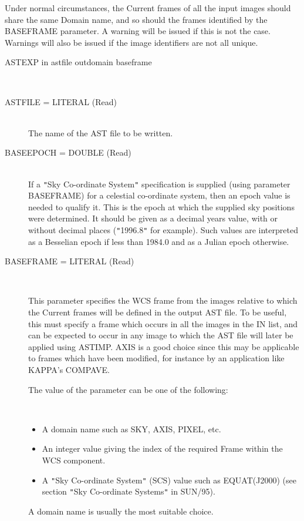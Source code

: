 \documentclass[twoside,11pt]{article}
\newcommand{\htmlref}[2]{#1}
\newcommand{\xref}[3]{#1}
\renewcommand{\_}{\texttt{\symbol{95}}}
\newcommand{\qt}[1]{{\tt "}#1{\tt "}}
\newcommand{\xroutine}[1]{\htmlref{{\sc #1}}{#1}}
\newcommand{\sstusage}[1]{\item[Usage:] \mbox{}
   \begin{description}
      {\ssttt \item #1}
   \end{description}
}
\newcommand{\sstparameters}[1]{
   \item[Parameters:] \mbox{} \\
   \vspace{-3.5ex}
   \begin{description}
      #1
   \end{description}
}
\newcommand{\sstsubsection}[1]{ \item[{#1}] \mbox{} \\}
\newcommand{\sstitemlist}[1]{
  \mbox{} \\
  \vspace{-3.5ex}
  \begin{itemize}
     #1
  \end{itemize}
}
\newcommand{\sstitem}{\item}
\newcommand{\sstusage}[1]{\item[Usage:]
      \begin{description}
         {\ssttt #1}
      \end{description}
      \\
   }
\newcommand{\sstparameters}[1]{
      \item[Parameters:] \\
      \begin{description}
         #1
      \end{description}
      \\
   }
\newcommand{\sstsubsection}[1]{\item[{#1}]}
\newcommand{\sstitemlist}[1]{
      \begin{itemize}
         #1
      \end{itemize}
      \\
   }
\newcommand{\sstitem}{\item}
\begin{document}
{{      Under normal circumstances, the Current frames of all the input
      images should share the same Domain name, and so should the frames
      identified by the BASEFRAME parameter.   A warning will be issued
      if this is not the case.  Warnings will also be issued if the image
      identifiers are not all unique.
   }
   \sstusage{
      ASTEXP in astfile outdomain baseframe
   }
   \sstparameters{
      \sstsubsection{
         ASTFILE = LITERAL (Read)
      } {
         The name of the AST file to be written.
      }
      \sstsubsection {
         BASEEPOCH = \_DOUBLE (Read)
      } {
         If a \qt{Sky Co-ordinate System} specification is supplied 
         (using
         parameter BASEFRAME) for a celestial co-ordinate system, then
         an epoch value is needed to qualify it. This is the epoch at
         which the supplied sky positions were determined. It should be
         given as a decimal years value, with or without decimal places
         (\qt{1996.8} for example). Such values are interpreted as a
         Besselian epoch if less than 1984.0 and as a Julian epoch
         otherwise.
      }
      \sstsubsection{
         BASEFRAME = LITERAL (Read)
      } {
         This parameter specifies the WCS frame from the images
         relative to which the Current frames will be defined in the
         output AST file.  To be useful, this must specify a frame
         which occurs in all the images in the IN list, and can be
         expected to occur in any image to which the AST file will
         later be applied using \xroutine{ASTIMP}.  
         AXIS is a good choice since
         this may be applicable to frames which have been modified,
         for instance by an application like KAPPA's 
         \xref{COMPAVE}{sun95}{COMPAVE}.

         The value of the parameter can be one of the following:
         \sstitemlist{
            \sstitem
               A domain name such as SKY, AXIS, PIXEL, etc.
            \sstitem
               An integer value giving the index of the required Frame
               within the WCS component.
            \sstitem
               A \qt{Sky Co-ordinate System} (SCS) value such as 
               EQUAT(J2000)
               (see section 
               \xref{\qt{Sky Co-ordinate Systems}}{sun95}{se_scs} in 
               SUN/95).
         }
         A domain name is usually the most suitable choice.

}}}
\end{document}
